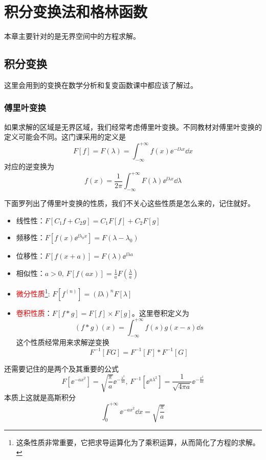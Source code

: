\chapter{积分变换法和格林函数}
本章主要针对的是无界空间中的方程求解。
\section{积分变换}
这里会用到的变换在数学分析和复变函数课中都应该了解过。
\subsection{傅里叶变换}
如果求解的区域是无界区域，我们经常考虑傅里叶变换。不同教材对傅里叶变换的定义可能会不同。这门课采用的定义是
\[F[f] = F(\lambda) = \int_{-\infty}^{+\infty} f(x) \ee^{-\ii\lambda x} \dd{x}\]
对应的逆变换为
\[f(x) = \frac{1}{2 \pi} \int_{-\infty}^{+\infty} F(\lambda) \ee^{\ii \lambda x} \dd{\lambda}\]

下面罗列出了傅里叶变换的性质，我们不关心这些性质是怎么来的，记住就好。
\begin{itemize}
    \item 线性性：$F[C_1 f + C_2 g] = C_1 F[f] + C_2 F[g]$
    \item 频移性：$F[f(x) \ee^{\ii \lambda_0 x}] = F(\lambda - \lambda_0)$
    \item 位移性：$F[f(x + a)] = F(\lambda) \ee^{\ii \lambda a}$
    \item 相似性：$a > 0, \, F[f(ax)] = \frac{1}{a} F(\frac{\lambda}{a})$
    \item \textcolor{red}{微分性质}\footnote{这条性质非常重要，它把求导运算化为了乘积运算，从而简化了方程的求解。}: $F[f^{(n)}] = (\ii \lambda)^n F[\lambda]$
    \item \textcolor{red}{卷积性质}：$F[f * g] = F[f] \times F[g]$。这里卷积定义为
        \[(f * g)(x) = \int_{-\infty}^{+\infty} f(s) g(x - s) \dd{s}\]
        这个性质经常用来求解逆变换
        \[F^{-1}[F G] = F^{-1}[F] * F^{-1}[G]\]
\end{itemize}

还需要记住的是两个及其重要的公式
\color{red}
\[F[\ee^{- a x^2}] = \sqrt{\frac{\pi}{a}} \ee^{-\frac{\lambda^2}{4a}},\, F^{-1}[\ee^{a \lambda^2}] = \frac{1}{\sqrt{4 \pi a}} \ee^{-\frac{x^2}{4a}}\]
\color{black}
本质上这就是高斯积分
\[\int_{0}^{+\infty} \ee^{-a x^2} \dd{x} = \sqrt{\frac{\pi}{a}}\]

